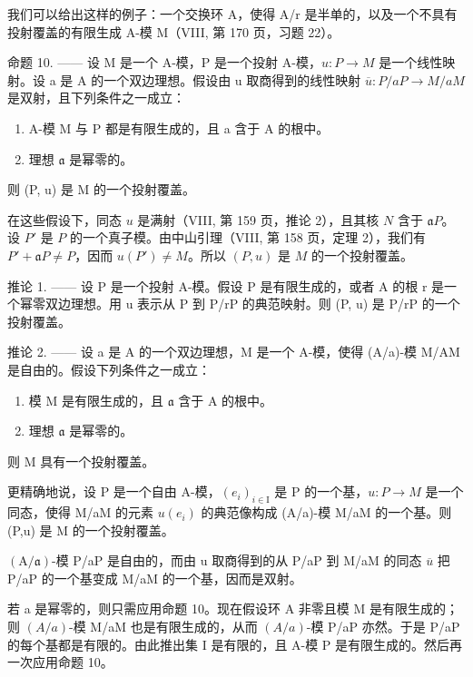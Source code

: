 我们可以给出这样的例子：一个交换环 A，使得 A/r 是半单的，以及一个不具有投射覆盖的有限生成 A-模 M（VIII, 第 170 页，习题 22）。

命题 10. —— 设 M 是一个 A-模，P 是一个投射 A-模，\(u : P \to M\) 是一个线性映射。设 a 是 A 的一个双边理想。假设由 u 取商得到的线性映射 \(\overline{u} : P / aP \to M / aM\) 是双射，且下列条件之一成立：

\begin{enumerate}
\def\labelenumi{(\roman{enumi})}
\item
  A-模 M 与 P 都是有限生成的，且 a 含于 A 的根中。
\item
  理想 \(\mathfrak{a}\) 是幂零的。
\end{enumerate}

则 (P, u) 是 M 的一个投射覆盖。

在这些假设下，同态 \(u\) 是满射（VIII, 第 159 页，推论 2），且其核 \(N\) 含于 \(\mathfrak{a}P\)。设 \(P'\) 是 \(P\) 的一个真子模。由中山引理（VIII, 第 158 页，定理 2），我们有 \(P' + \mathfrak{a}P \neq P\)，因而 \(u(P') \neq M\)。所以 \((P, u)\) 是 \(M\) 的一个投射覆盖。

推论 1. —— 设 P 是一个投射 A-模。假设 P 是有限生成的，或者 A 的根 r 是一个幂零双边理想。用 u 表示从 P 到 P/rP 的典范映射。则 (P, u) 是 P/rP 的一个投射覆盖。

推论 2. —— 设 a 是 A 的一个双边理想，M 是一个 A-模，使得 (A/a)-模 M/AM 是自由的。假设下列条件之一成立：

\begin{enumerate}
\def\labelenumi{(\roman{enumi})}
\item
  模 M 是有限生成的，且 \(\mathfrak{a}\) 含于 A 的根中。
\item
  理想 \(\mathfrak{a}\) 是幂零的。
\end{enumerate}

则 M 具有一个投射覆盖。

更精确地说，设 P 是一个自由 A-模，\((e_{i})_{i\in\mathrm{I}}\) 是 P 的一个基，\(u:P\to M\) 是一个同态，使得 M/aM 的元素 \(u(e_{i})\) 的典范像构成 (A/a)-模 M/aM 的一个基。则 (P,u) 是 M 的一个投射覆盖。

\((\mathrm{A}/\mathfrak{a})\)-模 P/aP 是自由的，而由 u 取商得到的从 P/aP 到 M/aM 的同态 \(\overline{u}\) 把 P/aP 的一个基变成 M/aM 的一个基，因而是双射。

若 a 是幂零的，则只需应用命题 10。现在假设环 A 非零且模 M 是有限生成的；则 \((A/a)\)-模 M/aM 也是有限生成的，从而 \((A/a)\)-模 P/aP 亦然。于是 P/aP 的每个基都是有限的。由此推出集 I 是有限的，且 A-模 P 是有限生成的。然后再一次应用命题 10。

